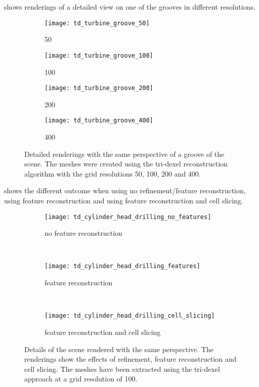  shows renderings of a detailed view on one of the grooves in different resolutions.

\begin{figure}
	\centering
	\begin{subfigure}[b]{0.24\textwidth}
		\centering
		\texttt{[image: td\_turbine\_groove\_50]}
		\caption{50}
		\label{fig:td_turbine_groove_50}
	\end{subfigure}
	\begin{subfigure}[b]{0.24\textwidth}
		\centering
		\texttt{[image: td\_turbine\_groove\_100]}
		\caption{100}
		\label{fig:td_turbine_groove_100}
	\end{subfigure}
	\begin{subfigure}[b]{0.24\textwidth}
		\centering
		\texttt{[image: td\_turbine\_groove\_200]}
		\caption{200}
		\label{fig:td_turbine_groove_200}
	\end{subfigure}
	\begin{subfigure}[b]{0.24\textwidth}
		\centering
		\texttt{[image: td\_turbine\_groove\_400]}
		\caption{400}
		\label{fig:td_turbine_groove_400}
	\end{subfigure}
	\caption{
		Detailed renderings with the same perspective of a groove of the \turbine scene.
		The meshes were created using the tri-dexel reconstruction algorithm with the grid resolutions 50, 100, 200 and 400.
	}
	\label{fig:td_grooves}
\end{figure}

 shows the different outcome when using no refinement/feature reconstruction, using feature reconstruction and using feature reconstruction and cell slicing.

\begin{figure}
	\centering
	\begin{subfigure}[b]{0.67\textwidth}
		\centering
		\texttt{[image: td\_cylinder\_head\_drilling\_no\_features]}
		\caption{no feature reconstruction}
		\label{fig:td_cylinder_head_drilling_no_features}
	\end{subfigure}
	\bigskip\\
	\begin{subfigure}[b]{0.67\textwidth}
		\centering
		\texttt{[image: td\_cylinder\_head\_drilling\_features]}
		\caption{feature reconstruction}
		\label{fig:td_cylinder_head_drilling_features}
	\end{subfigure}
	\bigskip\\
	\begin{subfigure}[b]{0.67\textwidth}
		\centering
		\texttt{[image: td\_cylinder\_head\_drilling\_cell\_slicing]}
		\caption{feature reconstruction and cell slicing}
		\label{fig:td_cylinder_head_drilling_cell_slicing}
	\end{subfigure}
	\caption{
		Details of the \cylinderhead scene rendered with the same perspective.
		The renderings show the effects of refinement, feature reconstruction and cell slicing.
		The meshes have been extracted using the tri-dexel approach at a grid resolution of 100.
	}
	\label{fig:td_features_and_cell_slicing}
\end{figure}

